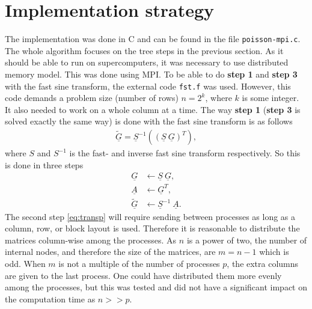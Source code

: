 \section{Implementation strategy}
%
The implementation was done in C and can be found in the file \verb+poisson-mpi.c+. The whole algorithm focuses on the tree steps in the previous section. As it should be able to run on supercomputers, it was necessary to use distributed memory model. This was done using MPI. To be able to do \textbf{step 1} and \textbf{step 3} with the fast sine transform, the external code \verb+fst.f+ was used. However, this code demands a problem size (number of rows) $n = 2^k$, where $k$ is some integer. It also needed to work on a whole column at a time. The way \textbf{step 1} (\textbf{step 3} is solved exactly the same way) is done with the fast sine transform is as follows
%
\begin{align}
\underline{\tilde{G}} = \underline{S}^{-1} \left( (\underline{S} \: \underline{G})^T   \right),
\end{align}
%
where $S$ and $S^{-1}$ is the fast- and inverse fast sine transform respectively. So this is done in three steps
%
\begin{align}
  \underline{G} &\leftarrow \underline{S} \: \underline{G},\\
  \label{eq:transp} 
  \underline{A} &\leftarrow \underline{G}^T,\\
  \underline{\tilde G} &\leftarrow \underline{S}^{-1} \: \underline{A}.
\end{align}
%
The second step \eqref{eq:transp} will require sending between processes as long as a column, row, or block layout is used. Therefore it is reasonable to distribute the matrices column-wise among the processes. As $n$ is a power of two, the number of internal nodes, and therefore the size of the matrices, are $m = n-1$ which is odd. When $m$ is not a multiple of the number of processes $p$, the extra columns are given to the last process. One could have distributed them more evenly among the processes, but this was tested and did not have a significant impact on the computation time as $n >> p$.

